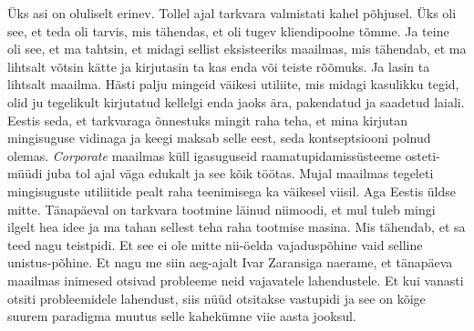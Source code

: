 
Üks asi on oluliselt erinev. Tollel ajal tarkvara valmistati kahel põhjusel. 
Üks oli see, et teda oli tarvis, mis tähendas, et  oli tugev kliendipoolne 
tõmme. Ja teine oli see, et ma tahtsin, et midagi sellist eksisteeriks 
maailmas, mis tähendab, et ma lihtsalt võtsin kätte ja kirjutasin ta kas enda 
või teiste rõõmuks. Ja lasin ta lihtsalt maailma. Hästi palju mingeid väikesi 
utiliite, mis midagi kasulikku tegid, olid ju tegelikult kirjutatud kellelgi 
enda jaoks ära, pakendatud ja saadetud laiali. Eestis seda, et tarkvaraga 
õnnestuks mingit raha teha, et mina kirjutan mingisuguse vidinaga ja keegi 
maksab selle eest, seda kontseptsiooni polnud olemas. \emph{Corporate} maailmas 
küll igasuguseid  raamatupidamissüsteeme osteti-müüdi juba tol ajal väga 
edukalt ja see kõik töötas. Mujal maailmas tegeleti mingisuguste utiliitide 
pealt raha teenimisega ka väikesel viisil. Aga Eestis üldse mitte. Tänapäeval on  tarkvara tootmine läinud niimoodi, et mul tuleb mingi 
ilgelt hea idee ja ma tahan sellest teha raha tootmise masina. Mis 
tähendab, et sa teed nagu teistpidi. Et see ei ole mitte nii-öelda 
vajaduspõhine vaid selline unistus-põhine. Et nagu me siin 
aeg-ajalt Ivar Zaransiga naerame, et tänapäeva 
maailmas  inimesed  otsivad probleeme neid vajavatele lahendustele. Et kui 
vanasti otsiti probleemidele lahendust, siis nüüd otsitakse vastupidi ja see on 
 kõige suurem paradigma muutus selle kahekümne viie aasta jooksul.